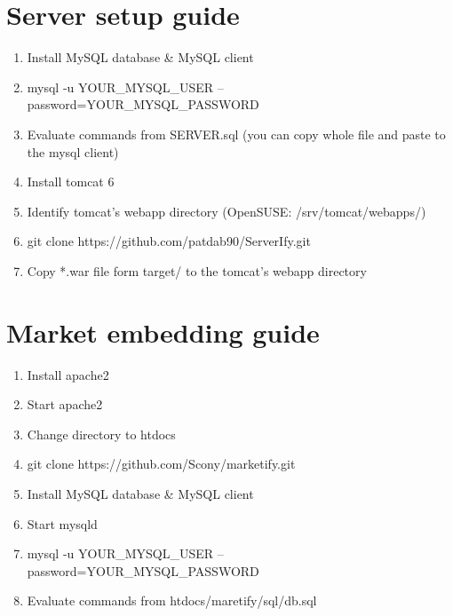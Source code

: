 \documentclass[11pt,a4paper,polish,thesis]{dcsbook}
\begin{document}
\chapter{Server setup guide}
\begin{enumerate}
\item Install MySQL database \& MySQL client
\item mysql -u YOUR\_MYSQL\_USER --password=YOUR\_MYSQL\_PASSWORD
\item Evaluate commands from SERVER.sql (you can copy whole file and paste to the mysql client)
\item Install tomcat 6
\item Identify tomcat's webapp directory (OpenSUSE: /srv/tomcat/webapps/)
\item git clone https://github.com/patdab90/ServerIfy.git
\item Copy *.war file form target/ to the tomcat's webapp directory
\end{enumerate}

\chapter{Market embedding guide}
\begin{enumerate}
\item Install apache2
\item Start apache2
\item Change directory to htdocs
\item git clone https://github.com/Scony/marketify.git
\item Install MySQL database \& MySQL client
\item Start mysqld
\item mysql -u YOUR\_MYSQL\_USER --password=YOUR\_MYSQL\_PASSWORD
\item Evaluate commands from htdocs/maretify/sql/db.sql
\end{enumerate}

\backmatter
\end{document}
